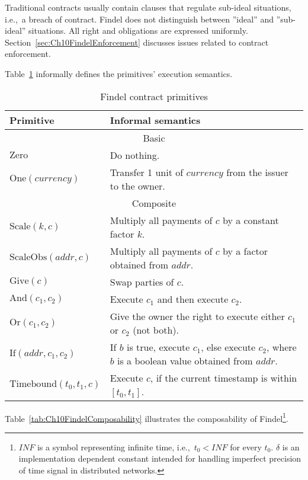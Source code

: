 Traditional contracts usually contain clauses that regulate sub-ideal situations, i.e.,~a breach of contract.
Findel does not distinguish between ''ideal'' and ''sub-ideal'' situations.
All right and obligations are expressed uniformly.
Section~\ref{sec:Ch10FindelEnforcement} discusses issues related to contract enforcement.

Table~\ref{tab:Ch10FindelSemantics} informally defines the primitives' execution semantics.

\begin{table}[ht]
	\centering
	\begin{tabular}{|p{0.25\linewidth}|p{0.75\linewidth}|}
		\hline
		\textbf{Primitive} & \textbf{Informal semantics} \\
		\hline\hline
		\multicolumn{2}{|c|}{Basic}\\
		\hline
		\(\mathrm{Zero}\) & Do nothing. \\
		\hline
		\(\mathrm{One} (currency)\) & Transfer 1 unit of \(currency\) from the issuer to the owner. \\
		\hline\hline
		\multicolumn{2}{|c|}{Composite}\\
		\hline
		\(\mathrm{Scale} (k, c)\) & Multiply all payments of \(c\) by a constant factor \(k\). \\
		\hline
		\(\mathrm{ScaleObs} (addr, c)\) & Multiply all payments of \(c\) by a factor obtained from \(addr\). \\
		\hline
		\(\mathrm{Give} (c)\) & Swap parties of \(c\). \\
		\hline
		\(\mathrm{And} (c_1, c_2)\) & Execute \(c_1\) and then execute \(c_2\). \\
		\hline
		\(\mathrm{Or} (c_1, c_2)\) & Give the owner the right to execute either \(c_1\) or \(c_2\) (not both). \\
		\hline
		\(\mathrm{If} (addr, c_1, c_2)\) & If \(b\) is true, execute \(c_1\), else execute \(c_2\), where \(b\) is a boolean value obtained from \(addr\). \\
		\hline
		\(\mathrm{Timebound} (t_0, t_1, c)\) & Execute \(c\), if the current timestamp is within \([t_0, t_1]\). \\
		\hline
	\end{tabular}
	\caption{Findel contract primitives}
	\label{tab:Ch10FindelSemantics}
\end{table}

Table~\ref{tab:Ch10FindelComposability} illustrates the composability of Findel\footnote{$INF$ is a symbol representing infinite time, i.e.,~$t_0 < INF$ for every $t_0$. $\delta$ is an implementation dependent constant intended for handling imperfect precision of time signal in distributed networks.}.

